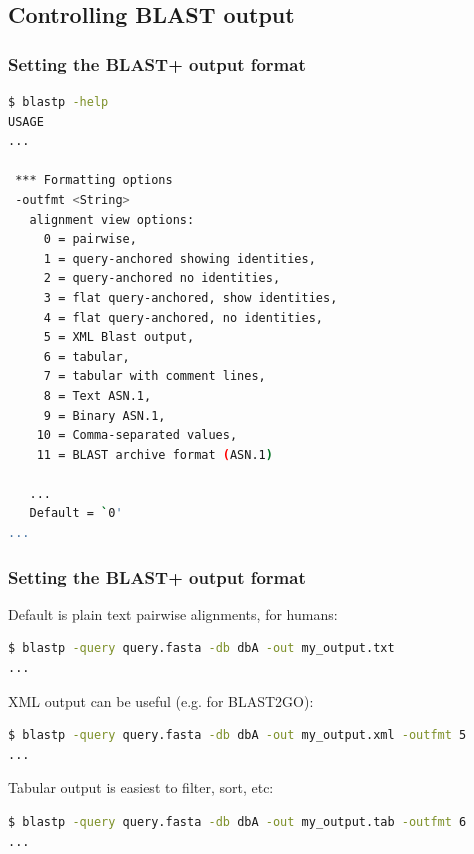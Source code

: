 \documentclass[table]{beamer}
\begin{document}
\subsection{Controlling BLAST output}

\begin{frame}[fragile]
\frametitle{Setting the BLAST+ output format}
%
%
\begin{lstlisting}[language=sh]
$ blastp -help
USAGE
...

 *** Formatting options
 -outfmt <String>
   alignment view options:
     0 = pairwise,
     1 = query-anchored showing identities,
     2 = query-anchored no identities,
     3 = flat query-anchored, show identities,
     4 = flat query-anchored, no identities,
     5 = XML Blast output,
     6 = tabular,
     7 = tabular with comment lines,
     8 = Text ASN.1,
     9 = Binary ASN.1,
    10 = Comma-separated values,
    11 = BLAST archive format (ASN.1)

   ...
   Default = `0'
...
\end{lstlisting}
\end{frame}


\begin{frame}[fragile]
\frametitle{Setting the BLAST+ output format}

Default is plain text pairwise alignments, for humans:

\begin{lstlisting}[language=sh]
$ blastp -query query.fasta -db dbA -out my_output.txt
...
\end{lstlisting}

XML output can be useful (e.g. for BLAST2GO):

\begin{lstlisting}[language=sh]
$ blastp -query query.fasta -db dbA -out my_output.xml -outfmt 5
...
\end{lstlisting}

Tabular output is easiest to filter, sort, etc:

\begin{lstlisting}[language=sh]
$ blastp -query query.fasta -db dbA -out my_output.tab -outfmt 6
...
\end{lstlisting}
\end{frame}
\end{document}
